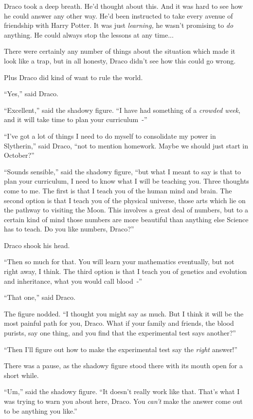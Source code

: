 Draco took a deep breath. He'd thought about this. And it was hard to see how he could answer any other way. He'd been instructed to take every avenue of friendship with Harry Potter. It was just \emph{learning,} he wasn't promising to \emph{do} anything. He could always stop the lessons at any time...

There were certainly any number of things about the situation which made it look like a trap, but in all honesty, Draco didn't see how this could go wrong.

Plus Draco did kind of want to rule the world.

``Yes,'' said Draco.

``Excellent,'' said the shadowy figure. ``I have had something of a \emph{crowded week}, and it will take time to plan your curriculum~-''

``I've got a lot of things I need to do myself to consolidate my power in Slytherin,'' said Draco, ``not to mention homework. Maybe we should just start in October?''

``Sounds sensible,'' said the shadowy figure, ``but what I meant to say is that to plan your curriculum, I need to know what I will be teaching you. Three thoughts come to me. The first is that I teach you of the human mind and brain. The second option is that I teach you of the physical universe, those arts which lie on the pathway to visiting the Moon. This involves a great deal of numbers, but to a certain kind of mind those numbers are more beautiful than anything else Science has to teach. Do you like numbers, Draco?''

Draco shook his head.

``Then so much for that. You will learn your mathematics eventually, but not right away, I think. The third option is that I teach you of genetics and evolution and inheritance, what you would call blood~-''

``That one,'' said Draco.

The figure nodded. ``I thought you might say as much. But I think it will be the most painful path for you, Draco. What if your family and friends, the blood purists, say one thing, and you find that the experimental test says another?''

``Then I'll figure out how to make the experimental test say the \emph{right} answer!''

There was a pause, as the shadowy figure stood there with its mouth open for a short while.

``Um,'' said the shadowy figure. ``It doesn't really work like that. That's what I was trying to warn you about here, Draco. You \emph{can't} make the answer come out to be anything you like.''

